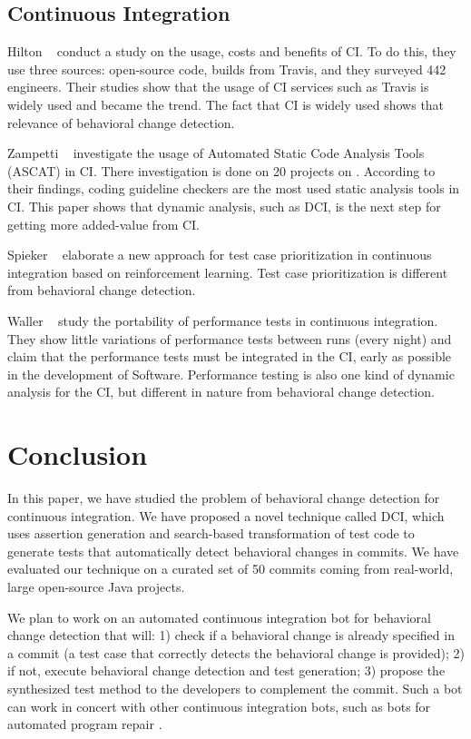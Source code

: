 \subsection{Continuous Integration}

Hilton \etal~\cite{Hilton:2016:UsageCI} conduct a study on the usage, costs and benefits of CI.
To do this, they use three sources:  open-source code, builds from Travis, and they surveyed 442 engineers.
Their studies show that the usage of CI services such as Travis is widely used and became the trend.
The fact that CI is widely used shows that relevance of behavioral change detection.

Zampetti \etal~\cite{static:analysis:in:ci} investigate the usage of Automated Static Code Analysis Tools (ASCAT) in CI.
There investigation is done on 20 projects on \gh.
According to their findings, coding guideline checkers are the most used static analysis tools in CI.
This paper shows that dynamic analysis, such as DCI, is the next step for getting more added-value from CI.   

Spieker \etal~\cite{Spieker:RL:selection} elaborate a new approach for test case prioritization in continuous integration based on reinforcement learning.
Test case prioritization is different from behavioral change detection.

Waller \etal~\cite{Waller:2015:IPB:2735399.2735416} study the portability of performance tests in continuous integration.
They show little variations of performance tests between runs (every night) and claim that the performance tests must be integrated in the CI, early as possible in the development of Software.
Performance testing is also one kind of dynamic analysis for the CI, but different in nature from behavioral change detection.

\section{Conclusion}
\label{sec:conclusion}

In this paper, we have studied the problem of behavioral change detection for continuous integration. 
We have proposed a novel technique called DCI, which uses assertion generation and search-based transformation of test code to generate tests that automatically detect behavioral changes in commits.
We have evaluated our technique on a curated set of 50 commits coming from real-world, large open-source Java projects.

We plan to work on an automated continuous integration bot for behavioral change detection that will:
1) check if a behavioral change is already specified in a commit (\ie a test case that correctly detects the behavioral change is provided);
2) if not, execute behavioral change detection and test generation;
3) propose the synthesized test method to the developers to complement the commit.
Such a bot can work in concert with other continuous integration bots, such as bots for automated program repair \cite{repairnator}.